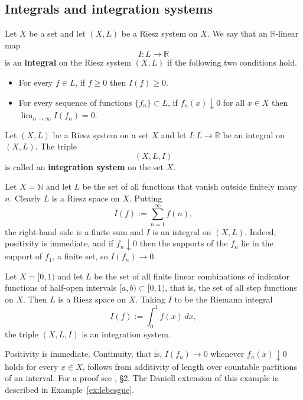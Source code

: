 \subsection{Integrals and integration systems}

\begin{definition}
  Let $X$ be a set and let $(X,L)$ be a Riesz system on $X$.
  We say that an $\mathbb{R}$-linear map
  \[
    I:L\to\mathbb{R}
  \]
  is an \textbf{integral} on the Riesz system $(X,L)$ if the following two
  conditions hold.
  \begin{itemize}
    \item For every $f\in L$, if $f\ge0$ then $I(f)\ge0$.
    \item For every sequence of functions $\{f_n\}\subset L$, if
      $f_n(x)\downarrow0$ for all $x\in X$ then $\lim_{n\to\infty}I(f_n)=0$.
  \end{itemize}
\end{definition}

\begin{definition}
  Let $(X,L)$ be a Riesz system on a set $X$ and let $I:L\to\mathbb{R}$
  be an integral on $(X,L)$.
  The triple
  \[
    (X,L,I)
  \]
  is called an \textbf{integration system} on the set $X$.
\end{definition}

\begin{example}[counting]\label{ex:counting}
  Let $X=\mathbb{N}$ and let $L$ be the set of all functions that vanish outside
  finitely many $n$.
  Clearly $L$ is a Riesz space on $X$.
  Putting
  \[
    I(f):=\sum_{n=1}^{\infty}f(n) ,
  \]
  the right-hand side is a finite sum and $I$ is an integral on $(X,L)$.
  Indeed, positivity is immediate, and if $f_n\downarrow0$ then the supports of
  the $f_n$ lie in the support of $f_1$, a finite set, so $I(f_n)\to0$.
\end{example}

\begin{example}\label{ex:step-functions}
  Let $X=[0,1)$ and let $L$ be the set of all finite linear combinations of
  indicator functions of half-open intervals $[a,b)\subset[0,1)$, that is, the
  set of all step functions on $X$.
  Then $L$ is a Riesz space on $X$.
  Taking $I$ to be the Riemann integral
  \[
    I(f):=\int_0^1f(x)\,dx ,
  \]
  the triple $(X,L,I)$ is an integration system.

  Positivity is immediate. Continuity, that is, $I(f_n)\to0$ whenever
  $f_n(x)\downarrow0$ holds for every $x\in X$, follows from additivity of length
  over countable partitions of an interval.
  For a proof see \cite{BM}, \S2.
  The Daniell extension of this example is described in
  Example~\ref{ex:lebesgue}.
\end{example}

